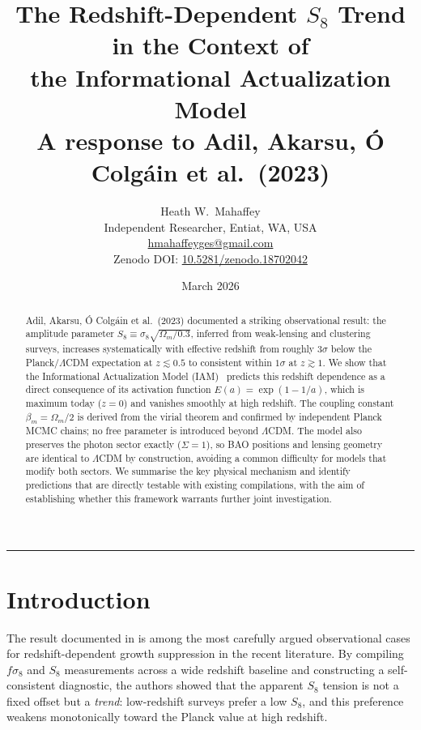 \documentclass[12pt,a4paper]{article}
\title{\textbf{The Redshift-Dependent $S_8$ Trend in the Context of\\
the Informational Actualization Model}\\[6pt]
\large A response to Adil, Akarsu, \'{O} Colg\'{a}in et al.\ (2023)}
\author{Heath W.\ Mahaffey\\[4pt]
\small Independent Researcher, Entiat, WA, USA\\
\small \href{mailto:hmahaffeyges@gmail.com}{hmahaffeyges@gmail.com}\\[4pt]
\small Zenodo DOI: \href{https://doi.org/10.5281/zenodo.18702042}{10.5281/zenodo.18702042}}
\date{March 2026}
\begin{document}
\maketitle
\thispagestyle{empty}

\begin{abstract}
\noindent
Adil, Akarsu, \'{O} Colg\'{a}in et al.\ (2023) documented a striking observational
result: the amplitude parameter $S_8 \equiv \sigma_8\sqrt{\Omega_m/0.3}$, inferred
from weak-lensing and clustering surveys, increases systematically with effective
redshift from roughly $3\sigma$ below the Planck/$\Lambda$CDM expectation at
$z \lesssim 0.5$ to consistent within $1\sigma$ at $z \gtrsim 1$.
We show that the Informational Actualization Model (IAM)~\citep{Mahaffey2026a}
predicts this redshift dependence as a direct consequence of its
activation function $E(a) = \exp(1 - 1/a)$, which is maximum today
($z=0$) and vanishes smoothly at high redshift.
The coupling constant $\beta_m = \Omega_m/2$ is derived from the virial theorem
and confirmed by independent Planck MCMC chains; no free parameter is introduced
beyond $\Lambda$CDM.
The model also preserves the photon sector exactly ($\Sigma = 1$), so BAO
positions and lensing geometry are identical to $\Lambda$CDM by construction,
avoiding a common difficulty for models that modify both sectors.
We summarise the key physical mechanism and identify predictions that are
directly testable with existing compilations, with the aim of establishing
whether this framework warrants further joint investigation.
\end{abstract}

\vspace{0.5em}
\hrule
\vspace{1.5em}

\section{Introduction}

The result documented in \citet{Adil2023} is among the most carefully argued
observational cases for redshift-dependent growth suppression in the recent
literature.  By compiling $f\sigma_8$ and $S_8$ measurements across a wide
redshift baseline and constructing a self-consistent diagnostic, the authors
showed that the apparent $S_8$ tension is not a fixed offset but a
\emph{trend}: low-redshift surveys prefer a low $S_8$, and this preference
weakens monotonically toward the Planck value at high redshift.
\end{document}
